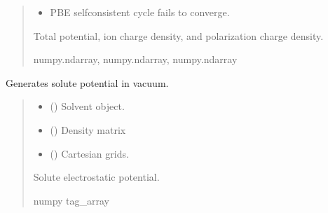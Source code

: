 \documentclass[letterpaper,10pt,english]{sphinxmanual}
\begin{document}
\begin{fulllineitems}
\begin{quote}
\begin{description}
\begin{itemize}
\item {} 
\sphinxAtStartPar
{} \textendash{} PBE self\sphinxhyphen{}consistent cycle fails to converge.

\end{itemize}

\sphinxAtStartPar
Total potential, ion charge density, and polarization charge density.

\sphinxAtStartPar
numpy.ndarray, numpy.ndarray, numpy.ndarray

\end{description}\end{quote}

\end{fulllineitems}


\begin{fulllineitems}
\label{\detokenize{fcdft.solvent:fcdft.solvent.pbe.make_phi_sol}}
\pysigstartsignatures
\pysiglinewithargsret
{}
{\sphinxparamcomma {}\sphinxparamcomma {}}
{}
\pysigstopsignatures
\sphinxAtStartPar
Generates solute potential in vacuum.
\begin{quote}\begin{description}
\begin{itemize}
\item {} 
\sphinxAtStartPar
{} ({\hyperref[\detokenize{fcdft.solvent:fcdft.solvent.pbe.PBE}]{}}) \textendash{} Solvent object.

\item {} 
\sphinxAtStartPar
{} () \textendash{} Density matrix

\item {} 
\sphinxAtStartPar
{} () \textendash{} Cartesian grids.

\end{itemize}

\sphinxAtStartPar
Solute electrostatic potential.

\sphinxAtStartPar
numpy tag\_array

\end{description}\end{quote}

\end{fulllineitems}
\end{document}
